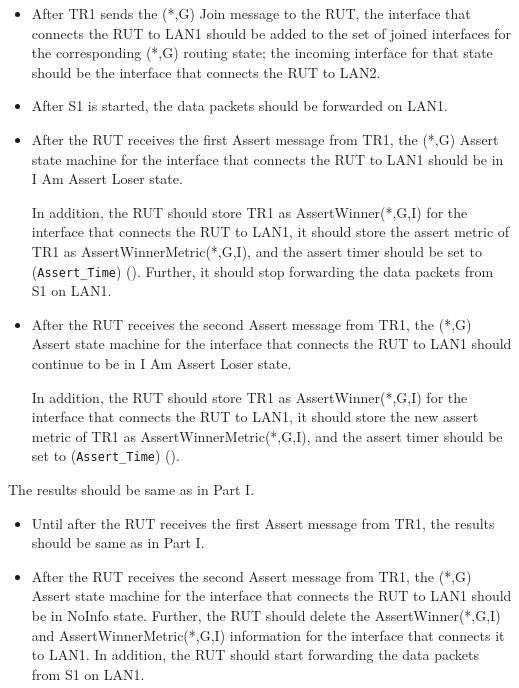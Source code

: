 \documentclass[11pt]{report}
\begin{document}
\begin{itemize}

  \item After TR1 sends the (*,G) Join message to the RUT, the interface that
  connects the RUT to LAN1 should be added to the set of joined interfaces for
  the corresponding (*,G) routing state; the incoming interface for that state
  should be the interface that connects the RUT to LAN2.

  \item After S1 is started, the data packets should be forwarded on LAN1.

  \item After the RUT receives the first Assert message from TR1, the (*,G)
  Assert state machine for the interface that connects the RUT to LAN1 should
  be in I Am Assert Loser state.

  In addition, the RUT should store TR1 as AssertWinner(*,G,I) for the
  interface that connects the RUT to LAN1, it should store the assert metric
  of TR1 as AssertWinnerMetric(*,G,I), and the assert timer should be set to
  (\verb=Assert_Time=) ({\PimsmAssertTime}).
  Further, it should stop forwarding the data packets from S1 on LAN1.

  \item After the RUT receives the second Assert message from TR1, the (*,G)
  Assert state machine for the interface that connects the RUT to LAN1 should
  continue to be in I Am Assert Loser state.

  In addition, the RUT should store TR1 as AssertWinner(*,G,I) for the
  interface that connects the RUT to LAN1, it should store the new assert
  metric of TR1 as AssertWinnerMetric(*,G,I), and the assert timer should be
  set to (\verb=Assert_Time=) ({\PimsmAssertTime}).

\end{itemize}


The results should be same as in Part I.


\begin{itemize}

  \item Until after the RUT receives the first Assert message from TR1, the
  results should be same as in Part I.

  \item After the RUT receives the second Assert message from TR1, the (*,G)
  Assert state machine for the interface that connects the RUT to LAN1 should
  be in NoInfo state.
  Further, the RUT should delete the AssertWinner(*,G,I) and
  AssertWinnerMetric(*,G,I) information for the interface that connects it to
  LAN1.
  In addition, the RUT should start forwarding the data packets from S1 on
  LAN1.

\end{itemize}
\end{document}
